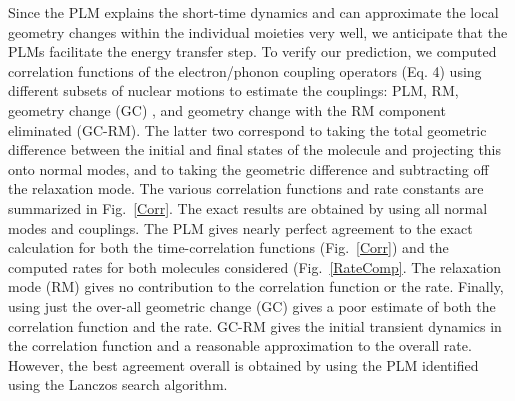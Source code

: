 Since the PLM explains the short-time dynamics and can approximate the local geometry changes within the individual
moieties very well, we anticipate that the PLMs facilitate the energy transfer step. To verify
our prediction, we computed correlation functions of the electron/phonon coupling operators
 (Eq. 4) using different  subsets of nuclear motions  to estimate the couplings:
 PLM,  RM,  geometry change (GC) , and
geometry change with the RM component eliminated (GC-RM).
The latter two correspond to taking the total geometric difference between the initial
and final states of the molecule and  projecting this onto normal modes, and to taking the geometric difference and
subtracting off the relaxation mode.
The various correlation functions and rate
constants are summarized in Fig.~\ref{Corr}.
The exact results are obtained by  using all normal modes and couplings.
The PLM gives nearly perfect agreement to the exact calculation  for both the
time-correlation functions (Fig.~\ref{Corr})  and the computed rates for both molecules considered  (Fig.~\ref{RateComp}.
The relaxation mode (RM) gives no contribution to the correlation function or the rate.
Finally, using just the over-all geometric change (GC) gives a poor estimate of both the correlation
function and the rate.   GC-RM gives the initial transient dynamics in the correlation function and
a reasonable approximation to  the overall rate.  However, the best agreement overall is
obtained by using the PLM identified using the Lanczos search algorithm.


